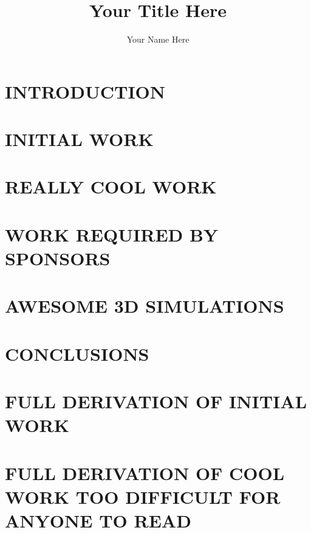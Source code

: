 \documentclass [PhD,letterpaper] {ucfthes}
\title		{Your Title Here}
\author		{Your Name Here}
\begin{document}
\makeintropages


\chapter{INTRODUCTION\label{ChIntro}}


\chapter{INITIAL WORK\label{ChInitial}}


\chapter{REALLY COOL WORK\label{ChCool}}


\chapter{WORK REQUIRED BY SPONSORS\label{ChSponsor}}


\chapter{AWESOME 3D SIMULATIONS\label{ChSimulation}}


\chapter{CONCLUSIONS\label{ChConclusions}}




\appendix

\chapter{FULL DERIVATION OF INITIAL WORK\label{ChInitialDerive}}


\chapter{FULL DERIVATION OF COOL WORK TOO DIFFICULT FOR ANYONE TO READ\label{ChCoolDerive}}


\end{document}
